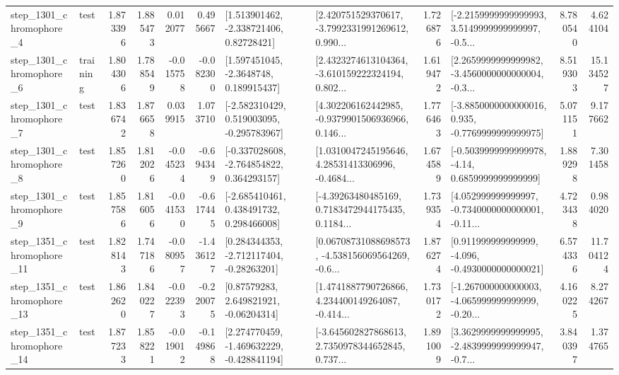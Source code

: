 \begin{tabular}{llrrrrllrlrr}
  step\_1301\_chromophore\_4 &      test &      1.873396 &    1.885473 &      0.012077 &  0.495667 &     [1.513901462, -2.338721406, 0.82728421] &  [2.420751529370617, -3.7992331991269612, 0.990... &       1.726876 &  [-2.2159999999999993, 3.5149999999999997, -0.5... &            8.780540 &          4.624104 \\
  step\_1301\_chromophore\_6 &  training &      1.804306 &    1.788549 &     -0.015758 & -0.082300 &      [1.597451045, -2.3648748, 0.189915437] &  [2.4323274613104364, -3.610159222324194, 0.802... &       1.619472 &  [2.2659999999999982, -3.4560000000000004, -0.3... &            8.519303 &         15.134527 \\
  step\_1301\_chromophore\_7 &      test &      1.836742 &    1.876658 &      0.039915 &  1.073710 &   [-2.582310429, 0.519003095, -0.295783967] &  [4.302206162442985, -0.9379901506936966, 0.146... &       1.776463 &  [-3.8850000000000016, 0.935, -0.7769999999999975] &            5.071151 &          9.177662 \\
  step\_1301\_chromophore\_8 &      test &      1.857260 &    1.812026 &     -0.045234 & -0.694349 &   [-0.337028608, -2.764854822, 0.364293157] &  [1.0310047245195646, 4.28531413306996, -0.4684... &       1.674589 &   [-0.5039999999999978, -4.14, 0.6859999999999999] &            1.889298 &          7.301458 \\
  step\_1301\_chromophore\_9 &      test &      1.857586 &    1.816056 &     -0.041530 & -0.617445 &    [-2.685410461, 0.438491732, 0.298466008] &  [-4.39263480485169, 0.7183472944175435, 0.1184... &       1.739354 &  [4.052999999999997, -0.7340000000000001, -0.11... &            4.723438 &          0.984020 \\
 step\_1351\_chromophore\_11 &      test &      1.828143 &    1.747186 &     -0.080957 & -1.436127 &    [0.284344353, -2.712117404, -0.28263201] &  [0.06708731088698573, -4.538156069564269, -0.6... &       1.876274 &   [0.911999999999999, -4.096, -0.4930000000000021] &            6.574336 &         11.704124 \\
 step\_1351\_chromophore\_13 &      test &      1.862620 &    1.840227 &     -0.022393 & -0.220075 &      [0.87579283, 2.649821921, -0.06204314] &  [1.4741887790726866, 4.234400149264087, -0.414... &       1.730172 &  [-1.267000000000003, -4.065999999999999, -0.20... &            4.160225 &          8.274267 \\
 step\_1351\_chromophore\_14 &      test &      1.877233 &    1.858221 &     -0.019012 & -0.149868 &   [2.274770459, -1.469632229, -0.428841194] &  [-3.645602827868613, 2.7350978344652845, 0.737... &       1.891009 &  [3.3629999999999995, -2.4839999999999947, -0.7... &            3.840397 &          1.374765 \\

\end{tabular}
